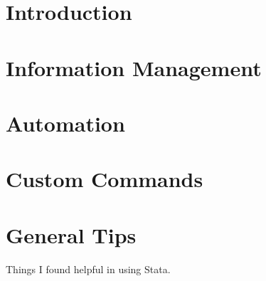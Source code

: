 \documentclass[12pt, a4paper]{article}
\begin{document}


\tableofcontents
{}

\newcommand{\sectionbreak}{%
  \par%
  \begin{center}---\texttt{*}---\end{center}%
  \clearpage%
}%
\listoflistings


\section{Introduction}



\section{Information Management}



\section{Automation}



\section{Custom Commands}



\section{General Tips}

Things I found helpful in using Stata.
\end{document}
